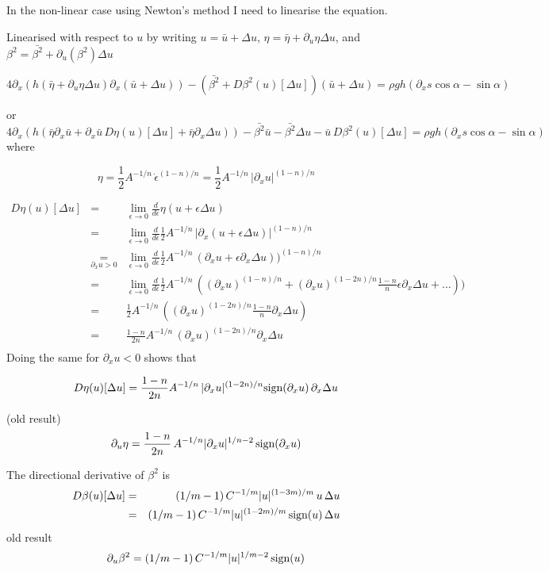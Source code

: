 \documentclass[10pt,a4paper]{book}
\newcommand{\p}{\partial}
\begin{document}
In the non-linear case using Newton's method I need to linearise the equation. 

Linearised with respect to $u$ by writing $u=\bar{u}+\Delta u$, $\eta=\bar{\eta}+ \p_u \eta \Delta
u$, and $\beta^2=\bar{\beta^2}+ \p_u (\beta^2) \Delta u$

\[
4 \p_x (h (\bar{\eta}+\p_u \eta \Delta u) \p_x (\bar{u}+\Delta u)) - 
(\bar{\beta^2}+D \beta^2(u)[\Delta u]) (\bar{u}+\Delta u) = \rho g h (\p_x s \cos \alpha  -  \sin \alpha )
\]

or
\begin{equation}
4 \p_x (h (\bar{\eta} \p_x \bar{u} + \p_x \bar{u} \,D \eta(u)[\Delta u] + \bar{\eta} \p_x \Delta u))
-\bar{\beta^2} \bar{u} - \bar{\beta^2} \Delta u - \bar{u} \, D \beta^2(u) [\Delta u]
 = \rho g h (\p_x s \cos \alpha  -  \sin \alpha )
\label{eq:4px}
\end{equation}
where

\[
\eta=\frac{1}{2} A^{-1/n} \,\dot{\epsilon}^{(1-n)/n} =\frac{1}{2} A^{-1/n} \,| \p_x u |^{(1-n)/n}
\]

\begin{eqnarray}
D \eta(u)[\Delta u]&=&\lim_{\epsilon\to 0} \frac{d}{d\epsilon} \eta(u+\epsilon \Delta u) \\
&=& \lim_{\epsilon \to 0} \frac{d}{d\epsilon} \frac{1}{2} A^{-1/n} \,| \p_x (u+\epsilon \Delta u) |^{(1-n)/n} \nonumber \\
&\underset{\p_x u > 0}{=}& \lim_{\epsilon \to 0} \frac{d}{d\epsilon}\frac{1}{2} A^{-1/n} \, (\p_x u+\epsilon \p_x \Delta u) )^{(1-n)/n} \nonumber \\
&=& \lim_{\epsilon \to 0} \frac{d}{d\epsilon}\frac{1}{2} A^{-1/n} \, ((\p_x u)^{(1-n)/n}+(\p_x u)^{(1-2n)/n} \frac{1-n}{n} \epsilon \p_x \Delta u+ \ldots) ) \nonumber \\
&=& \frac{1}{2} A^{-1/n} \, ((\p_x u)^{(1-2n)/n} \frac{1-n}{n} \p_x \Delta u) \nonumber \\
&=& \frac{1-n}{2n} A^{-1/n} \, (\p_x u)^{(1-2n)/n}  \p_x \Delta u \nonumber \\
\end{eqnarray}
Doing the same for $\p_x u <0$ shows that

\[
D \eta(u)[\Delta u]=\frac{1-n}{2n} A^{-1/n} \, |\p_x u|^{(1-2n)/n}  \hbox{sign}(\p_x u) \, \p_x \Delta u 
\]

(old result)
\[
\p_u \eta=\frac{1-n}{2n}  \, A^{-1/n} |\p_x u|^{1/n-2} \, \hbox{sign}(\p_x u)
\]

The directional derivative of $\beta^2$ is
\begin{eqnarray*}
D \beta(u)[\Delta u]
&=& (1/m-1) \, C^{-1/m}  |u|^{(1-3m)/m}\, u\, \Delta u \\
&=& (1/m-1) \, C^{-1/m}  |u|^{(1-2m)/m}\, \hbox{sign}(u)\, \Delta u \\
\end{eqnarray*}
old result
\[
\p_u \beta^2 = (1/m-1) \, C^{-1/m} |u|^{1/m-2} \, \hbox{sign}(u)
\]
\end{document}
